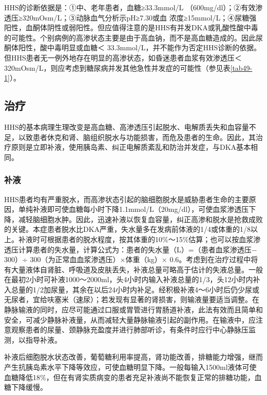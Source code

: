 HHS的诊断依据是：①中、老年患者，血糖≥33.3mmol/L
（600mg/dl）；②有效渗透压≥320mOsm/L；③动脉血气分析示pH≥7.30或血{}
浓度≥15mmol/L；④尿糖强阳性，血酮体阴性或弱阳性。但应值得注意的是HHS有并发DKA或乳酸性酸中毒的可能性。个别病例的高渗状态主要是由于高血钠，而不是高血糖造成的。因此尿酮体阳性，酸中毒明显或血糖＜
33.3mmol/L，并不能作为否定HHS诊断的依据。但HHS患者无一例外地存在明显的高渗状态，如昏迷患者血浆有效渗透压＜
320mOsm/L，则应考虑到糖尿病并发其他急性并发症的可能性（参见表\ref{tab49-1}）。

\subsection{治疗}

HHS的基本病理生理改变是高血糖、高渗透压引起脱水、电解质丢失和血容量不足，以致患者休克和肾、脑组织脱水与功能损害，而危及患者的生命。因此，其治疗原则是立即补液，使用胰岛素、纠正电解质紊乱和防治并发症，与DKA基本相同。

\subsubsection{补液}

HHS患者均有严重脱水，而高渗状态引起的脑细胞脱水是威胁患者生命的主要原因，单纯补液即可使血糖每小时下降1.1mmol/L（20mg/dl），可使血浆渗透压下降，减轻脑细胞水肿。因此，迅速补液以恢复血容量，纠正高渗和脱水是抢救成败的关键。本症患者脱水比DKA严重，失水量多在发病前体液的1/4或体重的1/8以上。补液时可根据患者的脱水程度，按其体重的10\%～15\%估算；也可以按血浆渗透压计算患者的失水量，计算公式为：患者的失水量（L）=（患者血浆渗透压−
300）÷ 300（为正常血血浆渗透压）×体重（kg）×
0.6。考虑到在治疗过程中将有大量液体自肾脏、呼吸道及皮肤丢失，补液总量可略高于估计的失液总量。一般在最初2小时可补液1000～2000ml，头4小时内输入补液总量的1/3，头12小时内补入总量的1/2加尿量，其余在以后24小时内补足。经积极补液4～6小时后仍少尿或无尿者，宜给呋塞米（速尿）；若发现有显著的肾损害，则输液量要适当调整。在静脉输液的同时，应尽可能通过口服或胃管进行胃肠道补液，此法有效而且简单和安全，可减少静脉补液量，从而减轻大量静脉输液引起的副作用。在输液中，应注意观察患者的尿量、颈静脉充盈度并进行肺部听诊，有条件时应行中心静脉压监测，以指导补液。

补液后细胞脱水状态改善，葡萄糖利用率提高，肾功能改善，排糖能力增强，继而产生抗胰岛素水平下降等效应，可使血糖明显下降。一般每输入1500ml液体可使血糖降低18\%，但在有肾实质病变的患者充足补液尚不能恢复正常的排糖功能，血糖下降缓慢。

